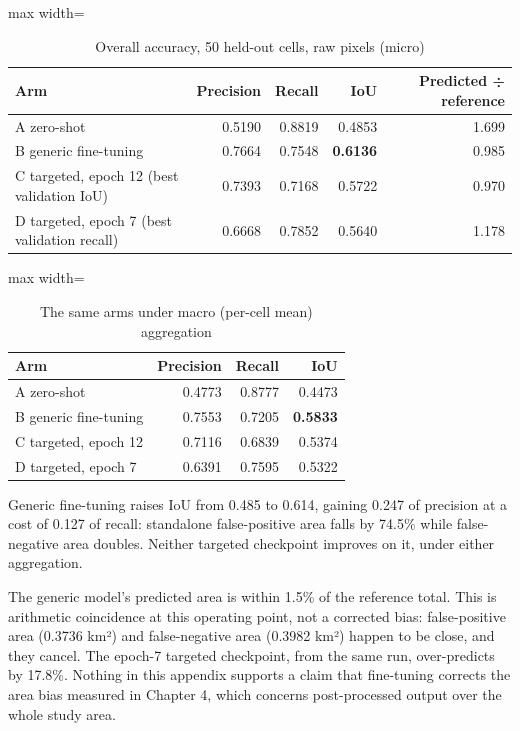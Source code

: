 \begin{table}[htbp]
\centering
\caption{Overall accuracy, 50 held-out cells, raw pixels (micro)}\label{tab:C.1}
\begin{adjustbox}{max width=\textwidth}
\begin{tabular}{@{}lrrrr@{}}
\toprule
Arm & Precision & Recall & IoU & Predicted ÷ reference \\
\midrule
A zero-shot & 0.5190 & 0.8819 & 0.4853 & 1.699 \\
B generic fine-tuning & 0.7664 & 0.7548 & \textbf{0.6136} & 0.985 \\
C targeted, epoch 12 (best validation IoU) & 0.7393 & 0.7168 & 0.5722 & 0.970 \\
D targeted, epoch 7 (best validation recall) & 0.6668 & 0.7852 & 0.5640 & 1.178 \\
\bottomrule
\end{tabular}
\end{adjustbox}
\end{table}
\restoreparskip

\begin{table}[htbp]
\centering
\caption{The same arms under macro (per-cell mean) aggregation}\label{tab:C.2}
\begin{adjustbox}{max width=\textwidth}
\begin{tabular}{@{}lrrr@{}}
\toprule
Arm & Precision & Recall & IoU \\
\midrule
A zero-shot & 0.4773 & 0.8777 & 0.4473 \\
B generic fine-tuning & 0.7553 & 0.7205 & \textbf{0.5833} \\
C targeted, epoch 12 & 0.7116 & 0.6839 & 0.5374 \\
D targeted, epoch 7 & 0.6391 & 0.7595 & 0.5322 \\
\bottomrule
\end{tabular}
\end{adjustbox}
\end{table}
\restoreparskip

Generic fine-tuning raises IoU from 0.485 to 0.614, gaining 0.247 of precision at a cost of 0.127 of recall: standalone false-positive area falls by 74.5\% while false-negative area doubles. Neither targeted checkpoint improves on it, under either aggregation.

The generic model's predicted area is within 1.5\% of the reference total. This is arithmetic coincidence at this operating point, not a corrected bias: false-positive area (0.3736 km²) and false-negative area (0.3982 km²) happen to be close, and they cancel. The epoch-7 targeted checkpoint, from the same run, over-predicts by 17.8\%. Nothing in this appendix supports a claim that fine-tuning corrects the area bias measured in Chapter 4, which concerns post-processed output over the whole study area.

